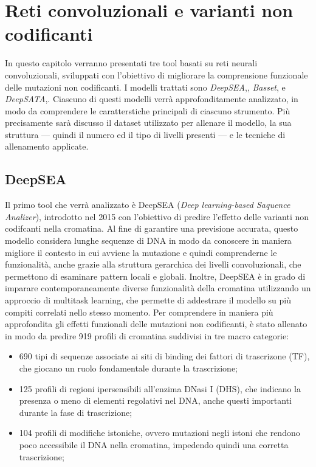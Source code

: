 \chapter{Reti convoluzionali e varianti non codificanti}\label{chp:CNN-non-coding-variants}

In questo capitolo verranno presentati tre tool basati su reti neurali convoluzionali, sviluppati con l'obiettivo di migliorare la comprensione funzionale delle mutazioni non codificanti. I modelli trattati sono \textsl{DeepSEA},\cite{zhou2015predicting}, \textsl{Basset},\cite{kelley2016basset} e \textsl{DeepSATA},\cite{ma2023deepsata}. Ciascuno di questi modelli verrà approfonditamente analizzato, in modo da comprendere le caratterstiche principali di ciascuno strumento. Più precisamente sarà discusso il dataset utilizzato per allenare il modello, la sua struttura — quindi il numero ed il tipo di livelli presenti — e le tecniche di allenamento applicate.





\section{DeepSEA}\label{sec:DeepSEA}
% 
Il primo tool che verrà analizzato è DeepSEA (\textit{Deep learning-based Saquence Analizer}), introdotto nel 2015 con l'obiettivo di predire l'effetto delle varianti non codifcanti nella cromatina. Al fine di garantire una previsione accurata, questo modello considera lunghe sequenze di \acs{DNA} in modo da conoscere in maniera migliore il contesto in cui avviene la mutazione e quindi comprenderne le funzionalità, anche grazie alla struttura gerarchica dei livelli convoluzionali, che permettono di esaminare pattern locali e globali. 
Inoltre, DeepSEA è in grado di imparare contemporaneamente diverse funzionalità della cromatina utilizzando un approccio di multitask learning, che permette di addestrare il modello su più compiti correlati nello stesso momento. Per comprendere in maniera più approfondita gli effetti funzionali delle mutazioni non codificanti, è stato allenato in modo da predire 919 profili di cromatina suddivisi in tre macro categorie:
% 
\begin{itemize}
    \item 690 tipi di sequenze associate ai siti di binding dei fattori di trascrizone (\acs{TF}), che giocano un ruolo fondamentale durante la trascrizione;
    \item 125 profili di regioni ipersensibili all'enzima DNasi I (\acs{DHS}), che indicano la presenza o meno di elementi regolativi nel \acs{DNA}, anche questi importanti durante la fase di trascrizione;
    \item 104 profili di modifiche istoniche, ovvero mutazioni negli istoni che rendono poco accessibile il \acs{DNA} nella cromatina, impedendo quindi una corretta trascrizione;
\end{itemize}
% 

